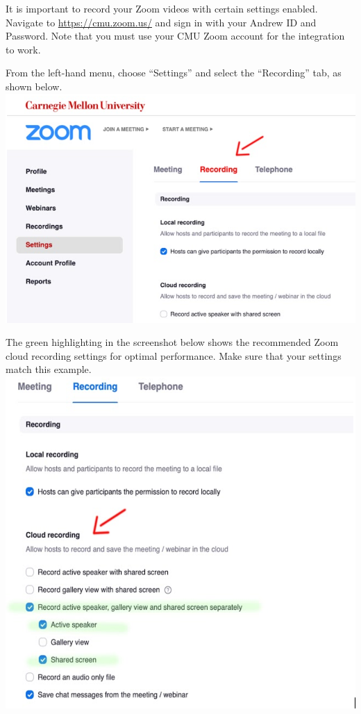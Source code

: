 \begin{gram}[Step 1/2]
	It is important to record your Zoom videos with certain settings enabled. Navigate to \href{https://cmu.zoom.us/}{https://cmu.zoom.us/} and sign in with your Andrew ID and Password. Note that you must use your CMU Zoom account for the integration to work.

	From the left-hand menu, choose ``Settings'' and select the ``Recording'' tab, as shown below.
{
\centering
\includegraphics[scale=0.4]{panopto/media/03-recording.png}
}

	The green highlighting in the screenshot below shows the recommended Zoom cloud recording settings for optimal performance. Make sure that your settings match this example.
{
		\includegraphics[scale=0.4]{panopto/media/04-settings.png}
}
\end{gram}

